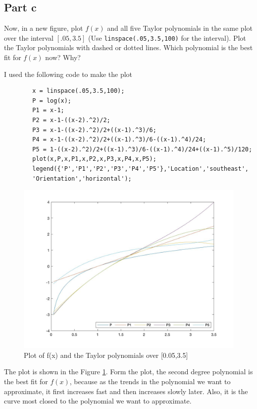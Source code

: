 \subsection{Part c}

\begin{question}
    Now, in a new figure, plot $f(x)$ and all five Taylor polynomials in the same plot over the interval $[.05,3.5]$ (Use \verb+linspace(.05,3.5,100)+ for the interval). Plot the Taylor polynomials with dashed or dotted lines. Which polynomial is the best fit for $f(x)$ now? Why?
\end{question}

\begin{answer}
    I used the following code to make the plot
    \begin{verbatim}
        x = linspace(.05,3.5,100);
        P = log(x);
        P1 = x-1;
        P2 = x-1-((x-2).^2)/2;
        P3 = x-1-((x-2).^2)/2+((x-1).^3)/6;
        P4 = x-1-((x-2).^2)/2+((x-1).^3)/6-((x-1).^4)/24;
        P5 = 1-((x-2).^2)/2+((x-1).^3)/6-((x-1).^4)/24+((x-1).^5)/120;
        plot(x,P,x,P1,x,P2,x,P3,x,P4,x,P5);
        legend({'P','P1','P2','P3','P4','P5'},'Location','southeast',
        'Orientation','horizontal');
    \end{verbatim}
    \begin{figure}[H]
        \centering
        \includegraphics[width=1.0\textwidth]{Figure 4.jpg}
        \caption{\label{fig:fig4}Plot of f(x) and the Taylor polynomials over [0.05,3.5]}
    \end{figure}
    The plot is shown in the Figure \ref{fig:fig4}. Form the plot, the second degree polynomial is the best fit for $f(x)$, because as the trends in the polynomial we want to approximate, it first increases fast and then increases slowly later. Also, it is the curve most closed to the polynomial we want to approximate.
\end{answer}